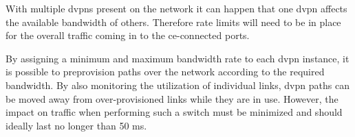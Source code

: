 

With multiple \acp{dvpn} present on the network it can happen that one \ac{dvpn} affects the available bandwidth of others. Therefore rate limits will need to be in place for the overall traffic coming in to the \ac{ce}-connected ports. 

By assigning a minimum and maximum bandwidth rate to each \ac{dvpn} instance, it is possible to preprovision paths over the network according to the required bandwidth. By also monitoring the utilization of individual links, \ac{dvpn} paths can be moved away from over-provisioned links while they are in use. However, the impact on traffic when performing such a switch must be minimized and should ideally last no longer than 50 ms.

